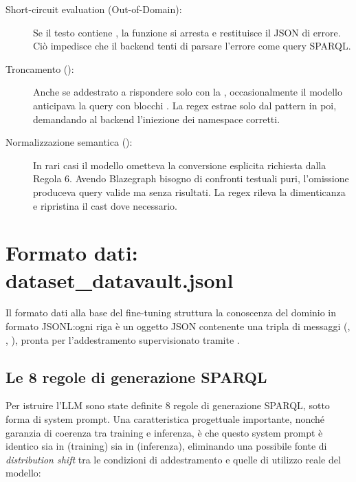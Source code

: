 \begin{description}
    \item[Short-circuit evaluation (Out-of-Domain):] Se il testo contiene , la funzione si arresta e restituisce il JSON di errore. Ciò impedisce che il backend tenti di parsare l'errore come query SPARQL.\@
    
    \item[Troncamento ():] Anche se addestrato a rispondere solo con la , occasionalmente il modello anticipava la query con blocchi . La regex estrae solo dal pattern  in poi, demandando al backend l'iniezione dei namespace corretti.
    
    \item[Normalizzazione semantica ():] In rari casi il modello ometteva la conversione esplicita  richiesta dalla Regola 6. Avendo Blazegraph bisogno di confronti testuali puri, l'omissione produceva query valide ma senza risultati. La regex rileva la dimenticanza e ripristina il cast  dove necessario. %
\end{description}

\newpage
\section{Formato dati: dataset\_datavault.jsonl}\label{sec:dataset}

Il formato dati alla base del fine-tuning struttura la conoscenza del dominio in formato JSONL:\@ ogni riga è un oggetto JSON contenente una tripla di messaggi (, , ), pronta per l'addestramento supervisionato tramite .

\subsection{Le 8 regole di generazione SPARQL}\label{subsec:regole}

Per istruire l'LLM sono state definite 8 regole di generazione SPARQL, sotto forma di system prompt. 
Una caratteristica progettuale importante, nonché garanzia di coerenza tra training e inferenza, è che questo system prompt è identico sia in  (training) sia in  (inferenza), eliminando una possibile fonte di \textit{distribution shift} tra le condizioni di addestramento e quelle di utilizzo reale del modello:

